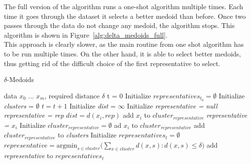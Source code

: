 \documentclass[thesis=B,english]{FITthesis}[2012/10/20]
\begin{document}
The full version of the algorithm runs a one-shot algorithm multiple times.
Each time it goes through the dataset it selects a better medoid than before.
Once two passes through the data do not change any medoid, the algorithm stops.
This algorithm is shown in Figure~\ref{alg:delta_medoids_full}.\\

This approach is clearly slower, as the main routine from one shot algorithm has to be run multiple times.
On the other hand, it is able to select better medoids, thus getting rid of the difficult choice of the first representative to select.

\begin{algorithm}
    \caption{$\delta$-Medoids}
    \label{delta_medoids_full}
    \begin{algorithmic}[1]
        \INPUT data $x_0$ ... $x_m$, required distance $\delta$
        \STATE t = 0
        \STATE Initialize $representatives_{t_0} = \emptyset$
        \STATE Initialize \textit{clusters} = $\emptyset$
        \DO
            \STATE $t = t + 1$
                \STATE Initialize \textit{dist} = $\infty$
                \STATE Initialize \textit{representative = null}
                        \STATE \textit{representative = rep}
                        \STATE $dist = d(x_i, rep)$
                    \ENDIF
                \ENDFOR
                    \STATE add $x_i$ to $cluster_{representative}$
                \ELSE
                    \STATE \textit{representative = $x_i$}
                    \STATE Initialize $cluster_{representative} = \emptyset$
                    \STATE ad $x_i$ to $cluster_{representative}$
                    \STATE add $cluster_{representative}$ to \textit{clusters}
                \ENDIF
            \ENDFOR
            \STATE Initialize $representatives_t = \emptyset$
                \STATE $representative = \textrm{argmin}_{s \in cluster} (\sum\limits_{x \in cluster}{d(x,s) : d(x,s) \le \delta)}$
                \STATE add \textit{representative} to $representatives_t$
            \ENDFOR
    \end{algorithmic}
\end{algorithm}
\end{document}
